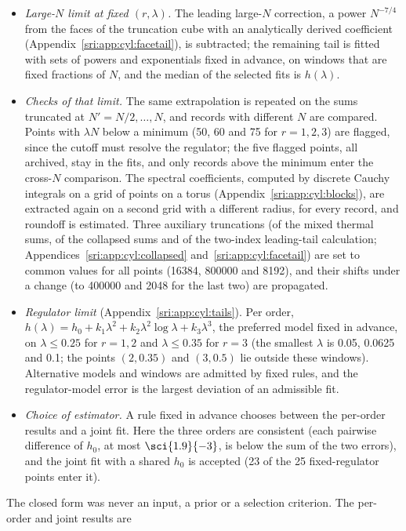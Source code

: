 \begin{itemize}
\item \emph{Large-$N$ limit at fixed $(r,\lambda)$.} The leading large-$N$ correction, a power $N^{-7/4}$ from the faces
 of the truncation cube with an analytically derived coefficient (Appendix~\ref{sri:app:cyl:facetail}), is subtracted; the remaining tail is fitted with
 sets of powers and exponentials fixed in advance, on windows that are fixed fractions of $N$, and the median of the
 selected fits is $h(\lambda)$.
\item \emph{Checks of that limit.} The same extrapolation is repeated on the sums truncated at $N'=N/2,\dots,N$, and
 records with different $N$ are compared. Points with $\lambda N$ below a minimum (50, 60 and 75 for $r=1,2,3$) are
 flagged, since the cutoff must resolve the regulator; the five flagged points, all archived, stay in the fits, and
 only records above the minimum enter the cross-$N$ comparison. The spectral coefficients, computed by discrete Cauchy integrals on a grid of points on a
 torus (Appendix~\ref{sri:app:cyl:blocks}), are extracted again on a second grid with a different radius, for every record, and roundoff is estimated. Three
 auxiliary truncations (of the mixed thermal sums, of the collapsed sums and of the two-index leading-tail
 calculation; Appendices~\ref{sri:app:cyl:collapsed} and~\ref{sri:app:cyl:facetail}) are set to common values for all points
 (16384, 800000 and 8192), and their shifts under a change (to 400000 and 2048 for the last two) are propagated.
\item \emph{Regulator limit} (Appendix~\ref{sri:app:cyl:tails}). Per order, $h(\lambda)=h_0+k_1\lambda^2+k_2\lambda^2\log\lambda+k_3\lambda^3$, the
 preferred model fixed in advance, on $\lambda\le0.25$ for $r=1,2$ and $\lambda\le0.35$ for $r=3$ (the smallest
 $\lambda$ is 0.05, 0.0625 and 0.1; the points $(2,0.35)$ and $(3,0.5)$ lie outside these windows). Alternative models
 and windows are admitted by fixed rules, and the regulator-model error is the largest deviation of an admissible fit.
\item \emph{Choice of estimator.} A rule fixed in advance chooses between the per-order results and a joint fit. Here
 the three orders are consistent (each pairwise difference of $h_0$, at most $\sci{1.9}{-3}$, is below the sum of
 the two errors), and the joint fit with a shared $h_0$ is accepted (23 of the 25
 fixed-regulator points enter it).
\end{itemize}
The closed form was never an input, a prior or a selection criterion. The per-order and joint results are
